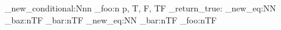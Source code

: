 \prg_new_conditional:Nnn
  \module_foo:n
  { p, T, F, TF }
  { \prg_return_true: }
\cs_new_eq:NN  %
  \module_baz:nTF
  \module_bar:nTF
\cs_new_eq:NN
  \module_bar:nTF
  \module_foo:nTF
